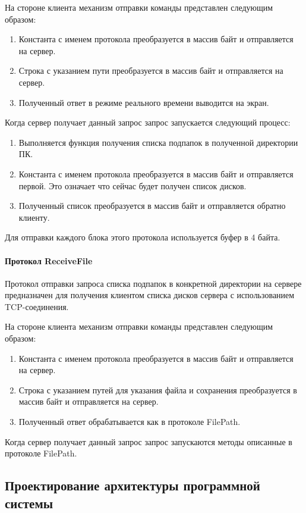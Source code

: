 На стороне клиента механизм отправки команды представлен следующим образом:
\begin{enumerate}
	\item Константа с именем протокола преобразуется в массив байт и отправляется на сервер.
	\item Строка с указанием пути преобразуется в массив байт и отправляется на сервер.
	\item Полученный ответ в режиме реального времени выводится на экран.
\end{enumerate}

Когда сервер получает данный запрос запрос запускается следующий процесс:
\begin{enumerate}
	\item Выполняется функция получения списка подпапок в полученной директории ПК.
	\item Константа с именем протокола преобразуется в массив байт и отправляется первой. Это означает что сейчас будет получен список дисков.
	\item Полученный список преобразуется в массив байт и отправляется обратно клиенту.
\end{enumerate}

Для отправки каждого блока этого протокола используется буфер в 4 байта.

\paragraph{Протокол ReceiveFile}
Протокол отправки запроса списка подпапок в конкретной директории на сервере предназначен для получения клиентом списка дисков сервера с использованием TCP-соединения. 

На стороне клиента механизм отправки команды представлен следующим образом:
\begin{enumerate}
	\item Константа с именем протокола преобразуется в массив байт и отправляется на сервер.
	\item Строка с указанием путей для  указания файла и сохранения преобразуется в массив байт и отправляется на сервер.
	\item Полученный ответ обрабатывается как в протоколе FilePath.
\end{enumerate}

Когда сервер получает данный запрос запрос запускаются методы описанные в протоколе FilePath.

\subsection{Проектирование архитектуры программной системы}
